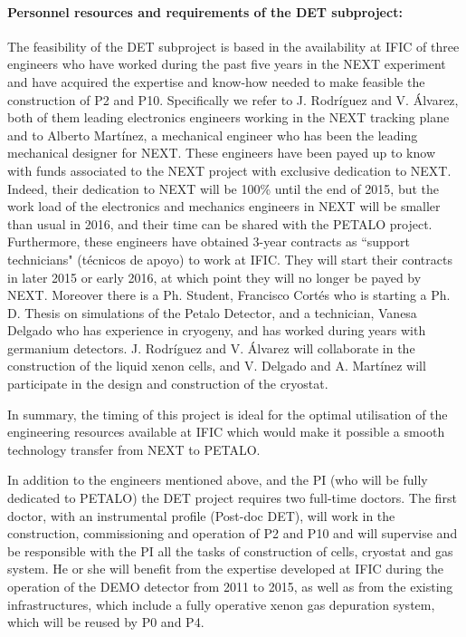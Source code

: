 \paragraph{Personnel resources and requirements of the DET subproject:}

The feasibility of the DET subproject is based in the availability at IFIC of three engineers who have worked during the past five years in the NEXT experiment and have acquired the expertise and know-how needed to make feasible the construction of P2 and P10. Specifically we refer to J. Rodríguez and V. Álvarez, both of them leading electronics engineers working in the NEXT tracking plane and to Alberto Martínez, a mechanical engineer who has been the leading mechanical designer for NEXT.
These engineers have been payed up to know with funds associated to the NEXT project with exclusive dedication to NEXT. Indeed, their dedication to NEXT will be 100\% until the end of 2015, but the work load of the electronics and mechanics engineers in NEXT will be smaller than usual in 2016, and their time can be shared with the PETALO project. Furthermore, these engineers have obtained 3-year contracts as ``support technicians" (técnicos de apoyo) to work at IFIC. They will start their contracts in later 2015 or early 2016, at which point they will no longer be payed by NEXT. 
Moreover there is a Ph. Student, Francisco Cortés who is starting a Ph. D. Thesis on simulations of the Petalo Detector, and a technician, Vanesa Delgado who has experience in cryogeny, and has worked during years with germanium detectors. 
J. Rodríguez and V. Álvarez will collaborate in the construction of the liquid xenon cells, and  V. Delgado and A. Martínez  will participate in the design and construction of the cryostat.

In summary, the timing of this project is ideal for the optimal utilisation of the engineering resources available at IFIC which would make it possible a smooth technology transfer from NEXT to PETALO. 


In addition to the engineers mentioned above, and the PI (who will be fully dedicated to PETALO) the DET project requires two full-time doctors. The first doctor, with an instrumental profile (Post-doc DET), will work in the construction, commissioning and operation of P2 and P10 and will supervise and be responsible with the PI  all the tasks of construction of cells, cryostat and gas system. He or she will benefit from the expertise developed at IFIC during the operation of the DEMO detector from 2011 to 2015, as well as from the existing infrastructures, which include a fully operative xenon gas depuration system, which will be reused by P0 and P4. 

